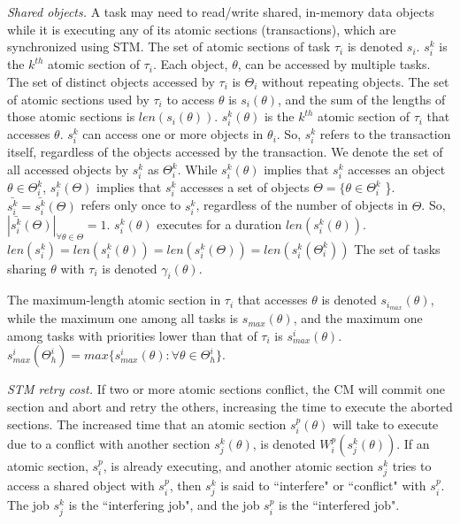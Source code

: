 \documentclass[10pt, conference, compsocconf]{IEEEtran}
\begin{document}
\textit{Shared objects.}
 A task may need to read/write shared, in-memory data objects while it is executing any of its atomic sections (transactions), which are synchronized using STM. 
The set of atomic sections of task $\tau_i$ is denoted $s_i$. $s_i^k$ is the $k^{th}$ atomic section of $\tau_i$. 
Each object, $\theta$, can be accessed by multiple tasks. The set of distinct objects accessed by $\tau_i$ is $\Theta_i$ without repeating objects.
The set of atomic sections used by $\tau_i$ to access $\theta$ is $s_i(\theta)$, and the sum of the lengths of those atomic sections is $len(s_i(\theta))$. $s_i^k(\theta)$ is the $k^{th}$ atomic section of $\tau_i$ that accesses $\theta$.
%
 $s_i^k$ can access one or more objects in $\theta_i$. So, $s_i^k$ refers to the transaction itself, regardless of the objects accessed by the transaction. We denote the set of all accessed objects by $s_i^k$ as $\Theta_i^k$. While $s_i^k(\theta)$ implies that $s_i^k$ accesses an object $\theta \in \Theta_i^k$, $s_i^k(\Theta)$ implies that $s_i^k$ accesses a set of objects $\Theta=\{\theta \in \Theta_i^k$ \}. $\bar{s_i^k}=\bar{s_i^k}(\Theta)$ refers only once to $s_i^k$, regardless of the number of objects in $\Theta$. So, $|\bar{s_i^k}(\Theta)|_{\forall \theta \in \Theta}=1$.
%
 $s_i^k(\theta)$  executes for a duration $len(s_i^k(\theta))$. $len(s_i^k)=len(s_i^k(\theta))=len(s_i^k(\Theta))=len(s_i^k(\Theta_i^k))$ The set of tasks sharing $\theta$ with $\tau_i$ is denoted $\gamma_i(\theta)$. 

The maximum-length atomic section in $\tau_i$ that accesses $\theta$ is denoted $s_{i_{max}} (\theta)$, while the maximum one among all tasks is $s_{max} (\theta)$, and the maximum one among tasks with priorities lower than that of $\tau_i$ is $s_{max}^i (\theta)$. $s_{max}^i(\Theta_h^i)=max\{s_{max}^i(\theta):\forall \theta \in \Theta_h^i\}$.

\textit{STM retry cost.} If two or more atomic sections conflict, the CM will commit one section and abort and retry the others, increasing the time to execute the aborted sections. The increased time that an atomic section $s_i^p (\theta)$ will take to execute due to a conflict with another section $s_j^k (\theta)$, is denoted $W_{i}^{p}(s_{j}^{k}(\theta))$. If an atomic section, $s_i^p$, is already executing, and another atomic section $s_j^k$ tries to access a shared object with $s_i^p$, then $s_j^k$ is said to ``interfere" or ``conflict" with $s_i^p$. The job $s_j^k$ is the ``interfering job", and the job $s_i^p$ is the ``interfered job".
\end{document}
